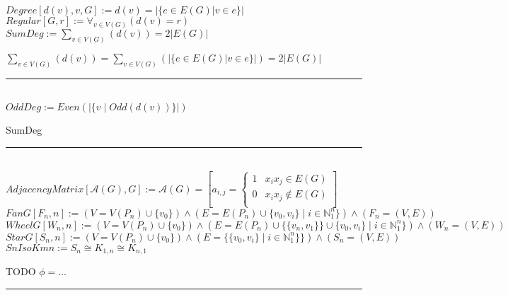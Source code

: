 \documentclass{book}
\newcommand{\abr}{:=}
\newcommand{\pr}[1]{\left(#1\right)}
\newcommand{\st}{\mathbin{|}}
\newcommand{\utup}[1]{\{#1\}}
\begin{document}



$Degree[d(v), v, G] \abr d(v) = |\{e \in E(G) | v \in e\}|$ \\
$Regular[G, r] \abr \forall_{v \in V(G)}\pr{d(v) = r}$ \\

$SumDeg \abr \sum \limits_{v \in V(G)}\pr{d(v)} = 2 |E(G)|$ \\
\begin{enumerate}
  \lit $\sum \limits_{v \in V(G)}\pr{d(v)} = \sum \limits_{v \in V(G)}\pr{|\{e \in E(G) | v \in e\}|} = 2 |E(G)|$ \\
\end{enumerate} \vspace{.75mm} \hrule \vspace{.75mm} \ \\

$OddDeg \abr Even\pr{|\{v \st Odd\pr{d(v)}\}|}$ \\
\begin{enumerate}
  \lit SumDeg
\end{enumerate} \vspace{.75mm} \hrule \vspace{.75mm} \ \\

$AdjacencyMatrix[\mathcal{A}(G), G] \abr \mathcal{A}(G) = \left[a_{i, j} = 
\begin{cases} 
  1 & x_i x_j \in E(G) \\
  0 &  x_i x_j \notin E(G) \\
\end{cases}\right]$ \\


$FanG[F_n, n] \abr \pr{V = V(P_n) \cup \{v_0\}} \land \pr{E = E(P_n) \cup \utup{v_0, v_i} \st i \in \mathbb{N}_1^n\}} \land \pr{F_n = (V, E)}$ \\
$WheelG[W_n, n] \abr \pr{V = V(P_n) \cup \{v_0\}} \land \pr{E = E(P_n) \cup \{\utup{v_n, v_1}\} \cup \utup{v_0, v_i} \st i \in \mathbb{N}_1^n\}} \land \pr{W_n = (V, E)}$ \\
$StarG[S_n, n] \abr \pr{V = V(P_n) \cup \{v_0\}} \land (E = \{\utup{v_0, v_i} \st i \in \mathbb{N}_1^n\}\}) \land \pr{S_n = (V, E)}$ \\


$SnIsoKmn \abr S_n \cong K_{1, n} \cong K_{n, 1}$
\begin{enumerate}
  \lit TODO $\phi = \ldots$
\end{enumerate} \vspace{.75mm} \hrule \vspace{.75mm} \ \\
\end{document}
